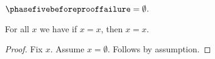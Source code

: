 \begin{definition}\label{phase5_before_proof_failure}
    $\phasefivebeforeprooffailure = \emptyset$.
\end{definition}

\begin{proposition}\label{phase5_mismatched_assumption}
    For all $x$ we have if $x = x$, then $x = x$.
\end{proposition}
\begin{proof}
    Fix $x$.
    Assume $x = \emptyset$.
    Follows by assumption.
\end{proof}
